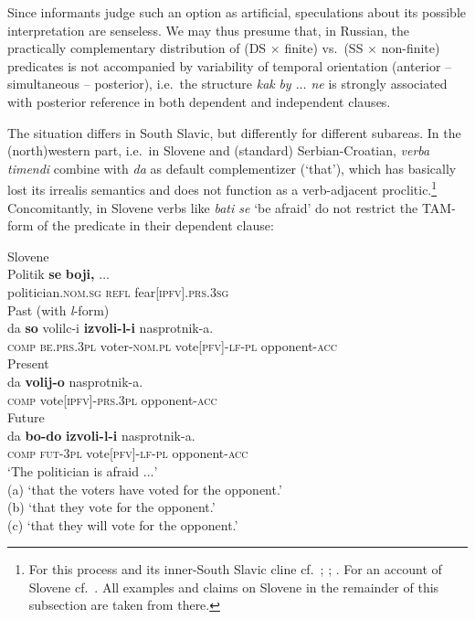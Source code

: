 \documentclass[output=paper,colorlinks,citecolor=brown]{langscibook}
\begin{document}
\noindent Since informants judge such an option as artificial, speculations about its possible interpretation are senseless. We may thus presume that, in Russian, the practically complementary distribution of (DS ${\times}$ finite) vs.\ (SS ${\times}$ non-finite) predicates is not accompanied by variability of temporal orientation (anterior -- simultaneous -- posterior), i.e.\ the structure \textit{kak} \textit{by $\ldots$ ne} is strongly associated with posterior reference in both dependent and independent clauses.


The situation differs in South Slavic, but differently for different subareas. In the (north)western part, i.e.\ in Slovene and (standard) Serbian-Croatian, \textit{verba timendi} combine with \textit{da} as default complementizer (`that'), which has basically lost its irrealis semantics and does not function as a verb-adjacent proclitic.\footnote{For this process and its inner-South Slavic cline cf.\ \citet{Sedláček1970}; \citet{Grković-Major2004}; \citet{Grković-Major2020}. For an account of Slovene cf.\ \citet[98--103]{Žele2017}. All examples and claims on Slovene in the remainder of this subsection are taken from there.} Concomitantly, in Slovene verbs like \textit{bati se} `be afraid' do not restrict the TAM-form of the predicate in their dependent clause:


\ea
\label{ex:wiemer27} \textnormal{Slovene} \\
\gll Politik \textbf{se} \textbf{boji,} $\ldots$ \\
politician\textsc{.nom.sg} \textsc{refl} fear\textsc{[ipfv].prs.3sg} \\
\ea \label{ex:wiemer27a} \textnormal{Past (with \textit{l}-form)} \\
\gll da \textbf{so} volilc-i \textbf{izvoli-l-i} nasprotnik-a. \\
\textsc{comp} \textsc{be.prs.3pl} voter-\textsc{nom.pl} vote\textsc{[pfv]-lf-pl} opponent-\textsc{acc} \\
\ex \label{ex:wiemer27b} \textnormal{Present} \\
\gll da \textbf{volij-o} nasprotnik-a. \\
\textsc{comp} vote\textsc{[ipfv]-prs.3pl} opponent-\textsc{acc} \\
\ex \label{ex:wiemer27c} \textnormal{Future} \\
\gll da \textbf{bo-do} \textbf{izvoli-l-i} nasprotnik-a. \\
\textsc{comp} \textsc{fut-3pl} vote\textsc{[pfv]-lf-pl} opponent-\textsc{acc} \\
\glt `The politician is afraid $\ldots$' \\
(a) `that the voters have voted for the opponent.' \\
(b) `that they vote for the opponent.' \\
(c)	`that they will vote for the opponent.'
\z
\z
\end{document}
